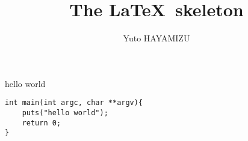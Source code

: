 \documentclass[a4j]{jsarticle}
\title{The \LaTeX \ skeleton}
\author{Yuto HAYAMIZU}
\begin{document}
\maketitle

hello world

\begin{lstlisting}[caption=hoge.c]
int main(int argc, char **argv){
    puts("hello world");
    return 0;
}
\end{lstlisting}



\end{document}
